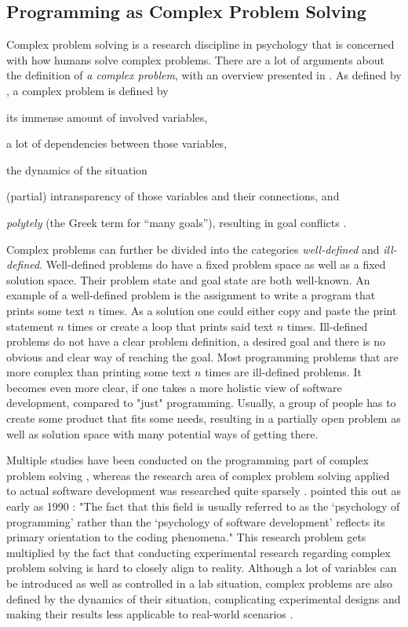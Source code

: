 \subsection{Programming as Complex Problem Solving}
Complex problem solving is a research discipline in psychology that is concerned with how humans solve complex problems.
There are a lot of arguments about the definition of \emph{a complex problem}, with an overview presented in \cite{dorner_complex_2017}.
As defined by \citeauthor{funke_complex_2012}, a complex problem is defined by
\begin{enumerate*}[label=(\roman*)]
\item its immense amount of involved variables,
\item a lot of dependencies between those variables,
\item the dynamics of the situation
\item (partial) intransparency of those variables and their connections, and
\item \emph{polytely} (the Greek term for “many goals”), resulting in goal conflicts \cite{funke_complex_2012}.
\end{enumerate*}
Complex problems can further be divided into the categories \emph{well-defined} and \emph{ill-defined}.
Well-defined problems do have a fixed problem space as well as a fixed solution space.
Their problem state and goal state are both well-known.
An example of a well-defined problem is the assignment to write a program that prints some text $n$ times.
As a solution one could either copy and paste the print statement $n$ times or create a loop that prints said text $n$ times.
Ill-defined problems do not have a clear problem definition, a desired goal and there is no obvious and clear way of reaching the goal.
Most programming problems that are more complex than printing some text $n$ times are ill-defined problems.
It becomes even more clear, if one takes a more holistic view of software development, compared to "just" programming.
Usually, a group of people has to create some product that fits some needs, resulting in a partially open problem as well as solution space with many potential ways of getting there.

Multiple studies have been conducted on the programming part of complex problem solving \cite{lawan_what_2019, gibson_software_2005, robertson_role_2008, taheri_evaluating_2015}, whereas the research area of complex problem solving applied to actual software development was researched quite sparsely \cite{wingo_using_2015}.
\citeauthor{curtis_psychology_1990} pointed this out as early as 1990 \cite{curtis_psychology_1990}: "The fact that this field is usually referred to as the `psychology of programming' rather than the `psychology of software development' reflects its primary orientation to the coding phenomena."
This research problem gets multiplied by the fact that conducting experimental research regarding complex problem solving is hard to closely align to reality.
Although a lot of variables can be introduced as well as controlled in a lab situation, complex problems are also defined by the dynamics of their situation, complicating experimental designs and making their results less applicable to real-world scenarios \cite{lawan_what_2019}.


